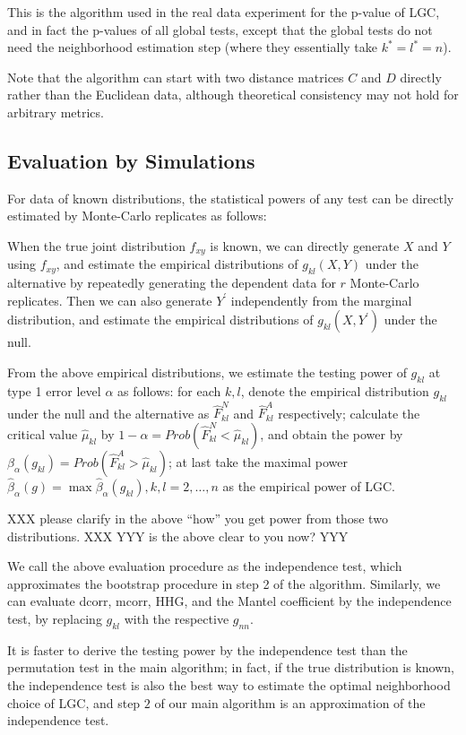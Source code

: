 \documentclass[11pt]{article}
\begin{document}
This is the algorithm used in the real data experiment for the p-value of LGC, and in fact the p-values of all global tests, except that the global tests do not need the neighborhood estimation step (where they essentially take $k^{*}=l^{*}=n$).

Note that the algorithm can start with two distance matrices $C$ and $D$ directly rather than the Euclidean data, although theoretical consistency may not hold for arbitrary metrics.

\subsection{Evaluation by Simulations}

For data of known distributions, the statistical powers of any test can be directly estimated by Monte-Carlo replicates as follows:

When the true joint distribution $f_{xy}$ is known, we can directly generate $X$ and $Y$ using $f_{xy}$, and estimate the empirical distributions of $g_{kl}(X,Y)$ under the alternative by repeatedly generating the dependent data for $r$ Monte-Carlo replicates. Then we can also generate $Y^{'}$ independently from the marginal distribution, and estimate the empirical distributions of $g_{kl}(X,Y^{'})$ under the null.

From the above empirical distributions, we estimate the testing power of $g_{kl}$ at type 1 error level $\alpha$ as follows: for each $k,l$, denote the empirical distribution $g_{kl}$ under the null and the alternative as $\hat{F}_{kl}^{N}$ and $\hat{F}_{kl}^A$ respectively; calculate the critical value $\hat{\mu}_{kl}$ by $1-\alpha=Prob(\hat{F}_{kl}^{N}<\hat{\mu}_{kl})$, and obtain the power by $\beta_{\alpha}(g_{kl})=Prob(\hat{F}_{kl}^{A}>\hat{\mu}_{kl})$; at last take the maximal power $\hat{\beta}_{\alpha}(g)=\max{\hat{\beta}_{\alpha}(g_{kl}), k,l=2, \ldots,n}$ as the empirical power of LGC.

XXX please clarify in the above ``how'' you get power from those two distributions. XXX
YYY is the above clear to you now?  YYY

We call the above evaluation procedure as the independence test, which approximates the bootstrap procedure in step 2 of the algorithm. Similarly, we can evaluate dcorr, mcorr, HHG, and the Mantel coefficient by the independence test, by replacing $g_{kl}$ with the respective $g_{nn}$. 

It is faster to derive the testing power by the independence test than the permutation test in the main algorithm; in fact, if the true distribution is known, the independence test is also the best way to estimate the optimal neighborhood choice of LGC, and step $2$ of our main algorithm is an approximation of the independence test. 
\end{document}
